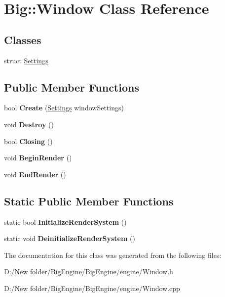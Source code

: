 \hypertarget{class_big_1_1_window}{}\section{Big\+:\+:Window Class Reference}
\label{class_big_1_1_window}
\subsection*{Classes}
\begin{DoxyCompactItemize}
\item 
struct \mbox{\hyperlink{struct_big_1_1_window_1_1_settings}{Settings}}
\end{DoxyCompactItemize}
\subsection*{Public Member Functions}
\begin{DoxyCompactItemize}
\item 
\mbox{\label{class_big_1_1_window_a6d7225b61e42c5a009a489ffbe5047de}} 
bool {\bfseries Create} (\mbox{\hyperlink{struct_big_1_1_window_1_1_settings}{Settings}} window\+Settings)
\item 
\mbox{\label{class_big_1_1_window_a73e8f7d24d10963b37882889cb788820}} 
void {\bfseries Destroy} ()
\item 
\mbox{\label{class_big_1_1_window_aabe160de18a58dce1d4ae6cad1c6e75b}} 
bool {\bfseries Closing} ()
\item 
\mbox{\label{class_big_1_1_window_a70e6bc2769082fe8843341518966a555}} 
void {\bfseries Begin\+Render} ()
\item 
\mbox{\label{class_big_1_1_window_a8dce70bac5aa23adfa8f78622d954c1a}} 
void {\bfseries End\+Render} ()
\end{DoxyCompactItemize}
\subsection*{Static Public Member Functions}
\begin{DoxyCompactItemize}
\item 
\mbox{\label{class_big_1_1_window_af7ae3a3d6139e336408904e2902c2ebe}} 
static bool {\bfseries Initialize\+Render\+System} ()
\item 
\mbox{\label{class_big_1_1_window_aa119268e8383f4dfe195342835577c57}} 
static void {\bfseries Deinitialize\+Render\+System} ()
\end{DoxyCompactItemize}


The documentation for this class was generated from the following files\+:\begin{DoxyCompactItemize}
\item 
D\+:/\+New folder/\+Big\+Engine/\+Big\+Engine/engine/Window.\+h\item 
D\+:/\+New folder/\+Big\+Engine/\+Big\+Engine/engine/Window.\+cpp\end{DoxyCompactItemize}
